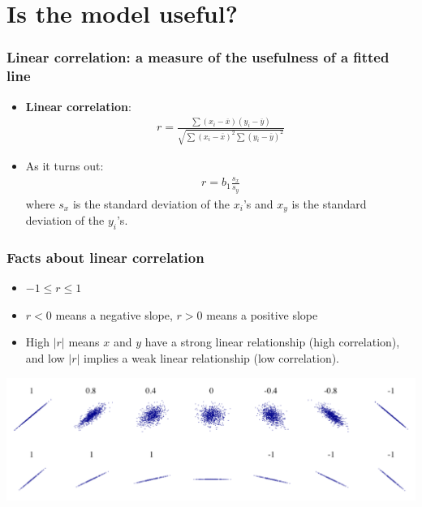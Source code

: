 \documentclass[handout]{beamer}\usepackage{graphicx, color}
\providecommand{\ov}[1]{\overline{#1}}
\numberwithin{equation}{section}
\begin{document}
\section{Is the model useful?}

\begin{frame}
\frametitle{Linear correlation: a measure of the usefulness of a fitted line}
\begin{itemize}
\pause \item {\bf Linear correlation}:
\pause \begin{align*}
r = \frac{\sum(x_i - \ov{x})(y_i - \ov{y})}{\sqrt{\sum (x_i - \ov{x})^2 \sum (y_i - \ov{y})^2}}
\end{align*}
\pause \item As it turns out:
\pause \begin{align*}
r = b_1\frac{s_x}{s_y}
\end{align*}
\pause where $s_x$ is the standard deviation of the $x_i$'s and $x_y$ is the standard deviation of the $y_i$'s. 
\end{itemize}
\end{frame}

\begin{frame}
\frametitle{Facts about linear correlation}
\begin{itemize}
\pause \item $-1 \le r \le 1$
\pause \item $r < 0$ means a negative slope, $r > 0$ means a positive slope
\pause \item High $|r|$ means $x$ and $y$ have a strong linear relationship (high correlation), and low $|r|$ implies a weak linear relationship (low correlation).
\end{itemize}

 \includegraphics{../../fig/diffcorrs.png}
\end{frame}
\end{document}
